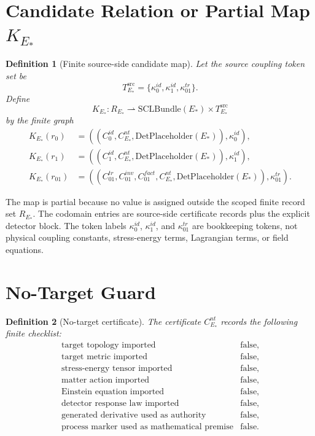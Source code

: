 \documentclass[11pt]{article}
\newcommand{\EStar}{E_{\ast}}
\newcommand{\SCLBundle}{\mathrm{SCLBundle}}
\newcommand{\DetPlaceholder}{\mathrm{DetPlaceholder}}
\newcommand{\KStar}{K_{E_{\ast}}}
\newcommand{\Src}{\mathrm{src}}
\newtheorem{definition}{Definition}
\begin{document}
\section{Candidate Relation or Partial Map \(\KStar\)}

\begin{definition}[Finite source-side candidate map]
Let the source coupling token set be
\[
  T_{\EStar}^{\Src}=
  \{\kappa^{id}_0,\kappa^{id}_1,\kappa^{tr}_{01}\}.
\]
Define
\[
  \KStar:R_{\EStar}\rightharpoonup
  \SCLBundle(\EStar)\times T_{\EStar}^{\Src}
\]
by the finite graph
\[
\begin{aligned}
  \KStar(r_0) &=
  ((C^{id}_0,C^{nt}_{\EStar},\DetPlaceholder(\EStar)),
  \kappa^{id}_0),\\
  \KStar(r_1) &=
  ((C^{id}_1,C^{nt}_{\EStar},\DetPlaceholder(\EStar)),
  \kappa^{id}_1),\\
  \KStar(r_{01}) &=
  ((C^{tr}_{01},C^{inv}_{01},C^{fact}_{01},
    C^{nt}_{\EStar},\DetPlaceholder(\EStar)),
  \kappa^{tr}_{01}).
\end{aligned}
\]
\end{definition}

The map is partial because no value is assigned outside the scoped finite
record set \(R_{\EStar}\). The codomain entries are source-side certificate
records plus the explicit detector block. The token labels
\(\kappa^{id}_0\), \(\kappa^{id}_1\), and \(\kappa^{tr}_{01}\) are bookkeeping
tokens, not physical coupling constants, stress-energy terms, Lagrangian
terms, or field equations.

\section{No-Target Guard}

\begin{definition}[No-target certificate]
The certificate \(C^{nt}_{\EStar}\) records the following finite checklist:
\[
\begin{array}{ll}
\text{target topology imported} & \text{false},\\
\text{target metric imported} & \text{false},\\
\text{stress-energy tensor imported} & \text{false},\\
\text{matter action imported} & \text{false},\\
\text{Einstein equation imported} & \text{false},\\
\text{detector response law imported} & \text{false},\\
\text{generated derivative used as authority} & \text{false},\\
\text{process marker used as mathematical premise} & \text{false}.
\end{array}
\]
\end{definition}
\end{document}

